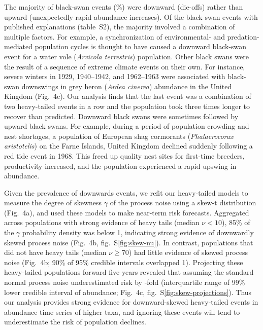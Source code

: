 The majority of black-swan events (\percBSDown \%) were downward (die-offs) rather than upward (unexpectedly rapid abundance increases). Of the black-swan events with published explanations (table~S2), the majority involved a combination of multiple factors. For example, a synchronization of environmental- and predation-mediated population cycles is thought to have caused a downward black-swan event for a water vole (\emph{Arvicola terrestris}) population\cite{saucy1994}. Other black swans were the result of a sequence of extreme climate events on their own. For instance, severe winters in 1929, 1940--1942, and 1962--1963 were associated with black-swan downswings in grey heron (\emph{Ardea cinerea}) abundance in the United Kingdom\cite{stafford1971} (Fig.~4c). Our analysis finds that the last event was a combination of two heavy-tailed events in a row and the population took three times longer to recover than predicted\cite{stafford1971}. Downward black swans were sometimes followed by upward black swans. For example, during a period of population crowding and nest shortages, a population of European shag cormorants (\emph{Phalacrocorax aristotelis}) on the Farne Islands, United Kingdom declined suddenly following a red tide event in 1968\cite{potts1980}. This freed up quality nest sites for first-time breeders, productivity increased, and the population experienced a rapid upswing in abundance\cite{potts1980}.

Given the prevalence of downwards events, we refit our heavy-tailed models to measure the degree of skewness \(\gamma\) of the process noise using a skew-t distribution (Fig.~4a), and used these models to make near-term risk forecasts. Aggregated across populations with strong evidence of heavy tails (median \(\nu < 10\)), 85\% of the \(\gamma\) probability density was below 1, indicating strong evidence of downwardly skewed process noise (Fig.~4b, fig.~S\ref{fig:skew-nu}). In contrast, populations that did not have heavy tails (median \(\nu \geq 70\)) had little evidence of skewed process noise (Fig.~4b; 90\% of 95\% credible intervals overlapped 1). Projecting these heavy-tailed populations forward five years revealed that assuming the standard normal process noise underestimated risk by \crashUnderRange-fold (interquartile range of 99\% lower credible interval of abundance; Fig.~4c, fig.~S\ref{fig:skew-projections}). Thus our analysis provides strong evidence for downward-skewed heavy-tailed events in abundance time series of higher taxa, and ignoring these events will tend to underestimate the risk of population declines.

